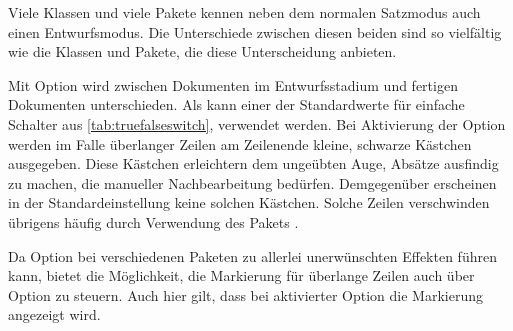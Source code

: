 Viele Klassen und viele Pakete kennen neben dem normalen Satzmodus auch
einen Entwurfsmodus.  Die Unterschiede zwischen diesen beiden sind so
vielfältig wie die Klassen und Pakete, die diese Unterscheidung anbieten.%

\begin{Declaration}
\end{Declaration}%
Mit Option  wird zwischen Dokumenten im Entwurfsstadium und fertigen
Dokumenten unterschieden. Als  kann
einer der Standardwerte für einfache Schalter aus
\autoref{tab:truefalseswitch},  verwendet
werden. Bei Aktivierung der Option werden
im Falle überlanger Zeilen am Zeilenende kleine, schwarze Kästchen
ausgegeben. Diese Kästchen erleichtern dem ungeübten Auge, Absätze ausfindig
zu machen, die manueller Nachbearbeitung bedürfen. Demgegenüber erscheinen in
der Standardeinstellung  keine solchen
Kästchen. Solche Zeilen verschwinden übrigens häufig durch Verwendung des
Pakets
\cite{package:microtype}.

Da Option  bei verschiedenen Paketen zu allerlei unerwünschten
Effekten führen kann, bietet \KOMAScript{} die Möglichkeit, die Markierung für
überlange Zeilen auch über Option
 zu
steuern. Auch hier gilt, dass bei aktivierter Option die Markierung angezeigt
wird.
%
\EndIndexGroup
%
\EndIndexGroup

